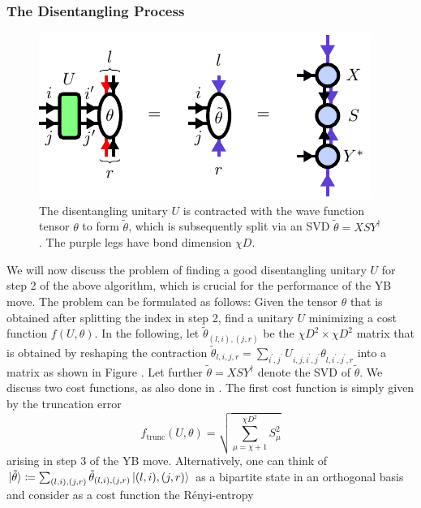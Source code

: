 \subsubsection*{\hspace{132pt}The Disentangling Process}
\begin{figure}
	\centering
	\includegraphics[scale=1]{figures/tikz/YB_isoTPS/theta_tilde_contraction/theta_tilde_contraction.pdf}
	\caption{The disentangling unitary $U$ is contracted with the wave function tensor $\theta$ to form $\tilde{\theta}$, which is subsequently split via an SVD $\tilde{\theta} = XSY^\dagger$. The purple legs have bond dimension $\chi D$.}
	\label{fig:disentangling_theta_definition}
\end{figure}
We will now discuss the problem of finding a good disentangling unitary $U$ for step 2 of the above algorithm, which is crucial for the performance of the YB move. The problem can be formulated as follows: Given the tensor $\theta$ that is obtained after splitting the index in step 2, find a unitary $U$ minimizing a cost function $f(U, \theta)$. In the following, let $\tilde{\theta}_{(l,i),(j,r)}$ be the $\chi D^2\times \chi D^2$ matrix that is obtained by reshaping the contraction $\tilde{\theta}_{l,i,j,r} = \sum_{i^\prime,j^\prime} U_{i,j,i^\prime,j^\prime}\theta_{l,i^\prime,j^\prime,r}$ into a matrix as shown in Figure . Let further $\tilde{\theta} = XSY^\dagger$ denote the SVD of $\tilde{\theta}$. We discuss two cost functions, as also done in \cite{cite:efficient_simulation_of_dynamics_in_two_dimensional_quantum_spin_systems}. The first cost function is simply given by the truncation error
\begin{equation}
	\label{eq:YB_move_disent_cost_function_truncation_error}
	f_\text{trunc}\left(U,\theta\right) = \sqrt{\sum_{\mu = \chi+1}^{\chi D^2}S_\mu^2}
\end{equation}
arising in step 3 of the YB move. Alternatively, one can think of $|\tilde{\theta}\rangle \coloneqq \sum_{(l,i), (j,r)}\tilde{\theta}_{(l,i),(j,r)}\ket{(l,i), (j, r)}$ as a bipartite state in an orthogonal basis and consider as a cost function the Rényi-entropy
